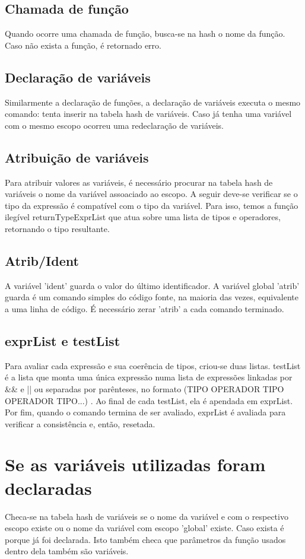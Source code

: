 \documentclass[a4paper,10pt]{article}
\begin{document}
\subsection{Chamada de função}
Quando ocorre uma chamada de função, busca-se na hash o nome da função. Caso não exista a função, é retornado erro.
\subsection{Declaração de variáveis}
Similarmente a declaração de funções, a declaração de variáveis executa o mesmo comando: tenta inserir na tabela hash de variáveis. Caso já tenha uma variável com o mesmo escopo ocorreu uma
redeclaração de variáveis.
\subsection{Atribuição de variáveis}
Para atribuir valores as variáveis, é necessário procurar na tabela hash de variáveis o nome da variável assoaciado ao escopo. A seguir deve-se verificar se o tipo da expressão
é compatível com o tipo da variável. Para isso, temos a função ilegível returnTypeExprList que atua sobre uma lista de tipos e operadores, retornando o tipo resultante.
\subsection{Atrib/Ident}
A variável 'ident' guarda o valor do último identificador. A variável global 'atrib' guarda é um comando simples do código fonte, na maioria das vezes, equivalente a uma linha de código.
É necessário zerar 'atrib' a cada comando terminado.
\subsection{exprList e testList}
Para avaliar cada expressão e sua coerência de tipos, criou-se duas listas. testList é a lista que monta uma única expressão numa lista de expressões linkadas
por \&\& e || ou separadas por parênteses, no formato (TIPO OPERADOR TIPO OPERADOR TIPO...) . Ao final de cada testList, ela é apendada em exprList. Por fim,
quando o comando termina de ser avaliado, exprList é avaliada para verificar a consistência e, então, resetada.

\section{Se as variáveis utilizadas foram declaradas}
Checa-se na tabela hash de variáveis se o nome da variável e com o respectivo escopo existe ou o nome da variável com escopo 'global' existe. 
Caso exista é porque já foi declarada. Isto também checa que parâmetros da função usados dentro dela também são variáveis.
\end{document}

